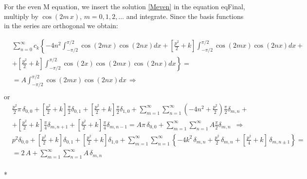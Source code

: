 For the even M equation, we insert the solution \eqref{Meven} in the equation {eqFinal}, multiply by $ \cos(2m\,x) $, $ m = 0,1,2,... $ and integrate. Since the basis functions in the series are orthogonal we obtain:

\begin{equation}
\begin{split}
& \sum_{n=0}^{\infty}c_k \left\{-4n^2\int_{-\pi/2}^{\pi/2}{\cos(2 mx)\cos(2 nx)dx} + \left[ \frac{p^2}{2} +k \right]\int_{-\pi/2}^{\pi/2}{\cos(2 mx)\cos(2 nx)dx} + \right. \\[.8em]
& \left. + \left[ \frac{p^2}{2} + k\right] \int_{-\pi/2}^{\pi/2}{\cos(2 x)\cos(2 mx)\cos(2 nx)dx} \right\} = \\[.8em]
& = A \int_{-\pi/2}^{\pi/2}{\cos(2 mx)\cos(2 nx)dx}  \,\Longrightarrow\\[.8em]
\end{split}
\end{equation}
or
\begin{equation}
\begin{split}
& \frac{p^2}{2}\pi\,\delta_{0,0}  +  \left[ \frac{p^2}{2} +k\right]\frac{\pi}{2}\delta_{0,1} + \left[\frac{p^2}{2} + k\right] \frac{\pi}{2}\delta_{1,0} + \sum_{m=1}^{\infty}\sum_{n=1}^{\infty} {\left(-4n^2 +\frac{p^2}{2}\right)\frac{\pi}{2} \delta_{m,n} } + \\[.8em]
& + \left[\frac{p^2}{2}+k\right]\frac{\pi}{4}\delta_{m,n+1} + \left[\frac{p^2}{2}+k\right]\frac{\pi}{4}\delta_{m,n-1}  = A \pi\,\delta_{0,0} + \sum_{m=1}^{\infty}\sum_{n=1}^{\infty}{A\frac{\pi}{2}\delta_{m,n}}\,\,\,\Longrightarrow \\[.8em]
& p^2\delta_{0,0} +  \left[ \frac{p^2}{2}+k\right]\delta_{0,1} + \left[ \frac{p^2}{2}+k\right]\delta_{1,0} + \sum_{m=1}^{\infty}\sum_{n=1}^{\infty}{\left\{ -4k^2\,\delta_{m,n} + \frac{p^2}{2}\,\delta_{m,n} +  \left[ \frac{p^2}{4} +k \right]\,\delta_{m,n \pm 1} \right\}} = \\[.8em]
& = 2\,A+ \sum_{m=1}^{\infty}\sum_{n=1}^{\infty}{A\,\delta_{m,n}}
\end{split}
\end{equation}\\*

